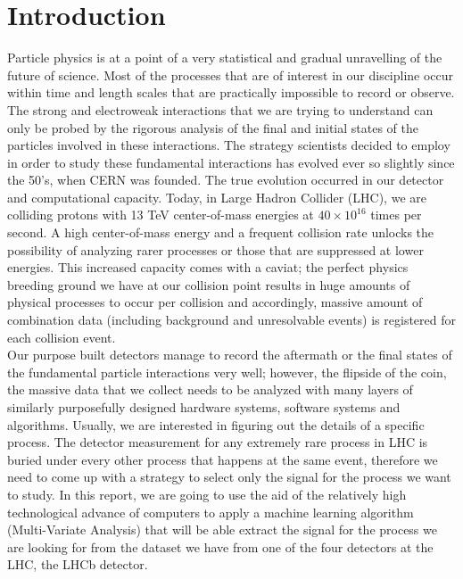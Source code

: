 \chapter*{Introduction}

Particle physics is at a point of a very statistical and gradual unravelling of the future of science. Most of the processes that are of interest in our discipline occur within time and length scales that are practically impossible to record or observe. The strong and electroweak interactions that we are trying to understand can only be probed by the rigorous analysis of the final and initial states of the particles involved in these interactions. The strategy scientists decided to employ in order to study these fundamental interactions has evolved ever so slightly since the 50's, when CERN was founded. The true evolution occurred in our detector and computational capacity. Today, in Large Hadron Collider (LHC), we are colliding protons with 13 TeV center-of-mass energies at \( 40 \times 10^{16} \) times per second. A high center-of-mass energy and a frequent collision rate unlocks the possibility of analyzing rarer processes or those that are suppressed at lower energies. This increased capacity comes with a caviat; the perfect physics breeding ground we have at our collision point results in huge amounts of physical processes to occur per collision and accordingly, massive amount of combination data (including background and unresolvable events) is registered for each collision event.\\

Our purpose built detectors manage to record the aftermath or the final states of the fundamental particle interactions very well; however, the flipside of the coin, the massive data that we collect needs to be analyzed with many layers of similarly purposefully designed hardware systems, software systems and algorithms. Usually, we are interested in figuring out the details of a specific process. The detector measurement for any extremely rare process in LHC is buried under every other process that happens at the same event, therefore we need to come up with a strategy to select only the signal for the process we want to study. In this report, we are going to use the aid of the relatively high technological advance of computers to apply a machine learning algorithm (Multi-Variate Analysis) that will be able extract the signal for the process we are looking for from the dataset we have from one of the four detectors at the LHC, the LHCb detector.